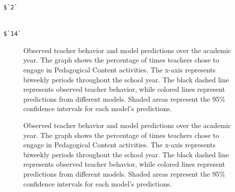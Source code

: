 \documentclass[
  number,
  preprint,
  3p,
  onecolumn]{elsarticle}
\begin{document}
\begin{verbatim}
$`2`
\end{verbatim}

\begin{verbatim}

$`14`
\end{verbatim}

\begin{figure}


\caption{\label{fig-action-percentages-1}Observed teacher behavior and
model predictions over the academic year. The graph shows the percentage
of times teachers chose to engage in Pedagogical Content activities. The
x-axis represents biweekly periods throughout the school year. The black
dashed line represents observed teacher behavior, while colored lines
represent predictions from different models. Shaded areas represent the
95\% confidence intervals for each model's predictions.}

\end{figure}%

\begin{figure}


\caption{\label{fig-action-percentages-2}Observed teacher behavior and
model predictions over the academic year. The graph shows the percentage
of times teachers chose to engage in Pedagogical Content activities. The
x-axis represents biweekly periods throughout the school year. The black
dashed line represents observed teacher behavior, while colored lines
represent predictions from different models. Shaded areas represent the
95\% confidence intervals for each model's predictions.}

\end{figure}%
\end{document}
